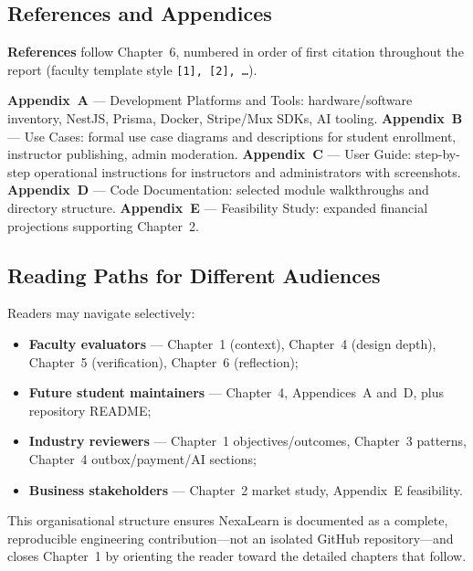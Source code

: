 \subsection{References and Appendices}
\label{subsec:doc-backmatter}

\textbf{References} follow Chapter~6, numbered in order of first citation throughout the report (faculty template style \texttt{[1], [2], \ldots}).

\textbf{Appendix~A} --- Development Platforms and Tools: hardware/software inventory, NestJS, Prisma, Docker, Stripe/Mux SDKs, AI tooling. \textbf{Appendix~B} --- Use Cases: formal use case diagrams and descriptions for student enrollment, instructor publishing, admin moderation. \textbf{Appendix~C} --- User Guide: step-by-step operational instructions for instructors and administrators with screenshots. \textbf{Appendix~D} --- Code Documentation: selected module walkthroughs and directory structure. \textbf{Appendix~E} --- Feasibility Study: expanded financial projections supporting Chapter~2.

\subsection{Reading Paths for Different Audiences}
\label{subsec:doc-reading-paths}

Readers may navigate selectively:
\begin{itemize}
  \item \textbf{Faculty evaluators} --- Chapter~1 (context), Chapter~4 (design depth), Chapter~5 (verification), Chapter~6 (reflection);
  \item \textbf{Future student maintainers} --- Chapter~4, Appendices~A and~D, plus repository README;
  \item \textbf{Industry reviewers} --- Chapter~1 objectives/outcomes, Chapter~3 patterns, Chapter~4 outbox/payment/AI sections;
  \item \textbf{Business stakeholders} --- Chapter~2 market study, Appendix~E feasibility.
\end{itemize}

This organisational structure ensures NexaLearn is documented as a complete, reproducible engineering contribution---not an isolated GitHub repository---and closes Chapter~1 by orienting the reader toward the detailed chapters that follow.
